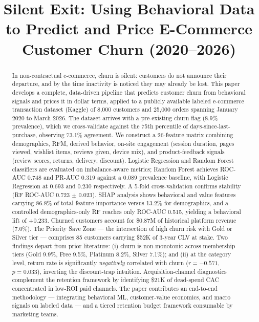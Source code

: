 \documentclass[conference]{IEEEtran}
\begin{document}
\title{Silent Exit: Using Behavioral Data to Predict and Price E-Commerce Customer Churn (2020--2026)}

\author{
}

\maketitle

\begin{abstract}
In non-contractual e-commerce, churn is silent: customers do not announce their departure, and by the time inactivity is noticed they may already be lost. This paper develops a complete, data-driven pipeline that predicts customer churn from behavioral signals and prices it in dollar terms, applied to a publicly available labeled e-commerce transaction dataset (Kaggle) of 8{,}000 customers and 25{,}000 orders spanning January 2020 to March 2026. The dataset arrives with a pre-existing churn flag (8.9\% prevalence), which we cross-validate against the 75th percentile of days-since-last-purchase, observing 73.1\% agreement. We construct a 26-feature matrix combining demographics, RFM, derived behavior, on-site engagement (session duration, pages viewed, wishlist items, reviews given, device mix), and product-feedback signals (review scores, returns, delivery, discount). Logistic Regression and Random Forest classifiers are evaluated on imbalance-aware metrics; Random Forest achieves ROC-AUC 0.748 and PR-AUC 0.319 against a 0.089 prevalence baseline, with Logistic Regression at 0.693 and 0.230 respectively. A 5-fold cross-validation confirms stability (RF ROC-AUC 0.723 $\pm$ 0.023). SHAP analysis shows behavioral and value features carrying 86.8\% of total feature importance versus 13.2\% for demographics, and a controlled demographics-only RF reaches only ROC-AUC 0.515, yielding a behavioral lift of +0.233. Churned customers account for \$0.87M of historical platform revenue (7.0\%). The Priority Save Zone — the intersection of high churn risk with Gold or Silver tier — comprises 85 customers carrying \$52K of 3-year CLV at stake. Two findings depart from prior literature: (i) churn is non-monotonic across membership tiers (Gold 9.9\%, Free 9.5\%, Platinum 8.2\%, Silver 7.1\%); and (ii) at the category level, return rate is significantly \emph{negatively} correlated with churn ($r = -0.571$, $p = 0.033$), inverting the discount-trap intuition. Acquisition-channel diagnostics complement the retention framework by identifying \$21K of dead-spend CAC concentrated in low-ROI paid channels. The paper contributes an end-to-end methodology — integrating behavioral ML, customer-value economics, and macro signals on labeled data — and a tiered retention budget framework consumable by marketing teams.
\end{abstract}
\end{document}
